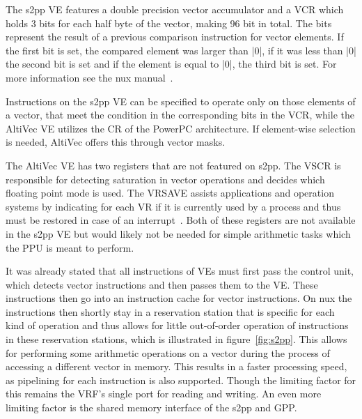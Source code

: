 {The \ac{s2pp} \ac{VE} features a double precision vector accumulator and a \ac{VCR} which holds 3 bits for each half byte of the vector, making 96 bit in total.
The bits represent the result of a previous comparison instruction for vector elements.
If the first bit is set, the compared element was larger than |0|, if it was less than |0| the second bit is set and if the element is equal to |0|, the third bit is set.
For more information see the nux manual~\citep[p.~23]{nuxmanual}.

Instructions on the \ac{s2pp} \ac{VE} can be specified to operate only on those elements of a vector, that meet the condition in the corresponding bits in the \ac{VCR}, while the AltiVec \ac{VE} utilizes the \ac{CR} of the PowerPC architecture.
If element-wise selection is needed, AltiVec offers this through vector masks.

The AltiVec \ac{VE} has two registers that are not featured on \ac{s2pp}.
The \ac{VSCR} is responsible for detecting saturation in vector operations and decides which floating point mode is used.
The \ac{VRSAVE} assists applications and operation systems by indicating for each \ac{VR} if it is currently used by a process and thus must be restored in case of an interrupt~\cite{AltiVec}.
Both of these registers are not available in the \ac{s2pp} \ac{VE} but would likely not be needed for simple arithmetic tasks which the \ac{PPU} is meant to perform.

It was already stated that all instructions of \ac{VE}s must first pass the control unit, which detects vector instructions and then passes them to the \ac{VE}.
These instructions then go into an instruction cache for vector instructions.
On nux the instructions then shortly stay in a reservation station that is specific for each kind of operation and thus allows for little out-of-order operation of instructions in these reservation stations, which is illustrated in figure~\ref{fig:s2pp}.
This allows for performing some arithmetic operations on a vector during the process of accessing a different vector in memory.
This results in a faster processing speed, as pipelining for each instruction is also supported.
Though the limiting factor for this remains the \ac{VRF}'s single port for reading and writing.
An even more limiting factor is the shared memory interface of the \ac{s2pp} and \ac{GPP}.

}
